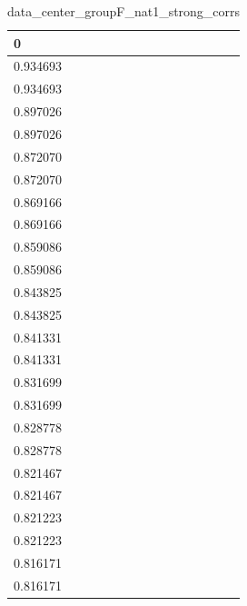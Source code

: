 \begin{table}
\caption{data_center_groupF_nat1_strong_corrs}
\label{tab:data_summary}
\begin{tabular}{lcr}
\toprule
0 \\
\midrule
0.934693 \\
0.934693 \\
0.897026 \\
0.897026 \\
0.872070 \\
0.872070 \\
0.869166 \\
0.869166 \\
0.859086 \\
0.859086 \\
0.843825 \\
0.843825 \\
0.841331 \\
0.841331 \\
0.831699 \\
0.831699 \\
0.828778 \\
0.828778 \\
0.821467 \\
0.821467 \\
0.821223 \\
0.821223 \\
0.816171 \\
0.816171 \\
\bottomrule
\end{tabular}
\end{table}
